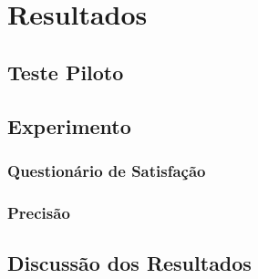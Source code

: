 \chapter{Resultados}\label{chapter:resultados}

\lipsum[1]

\section{Teste Piloto}

\lipsum[1]

\section{Experimento}

\lipsum[1]

\subsection{Questionário de Satisfação}

\lipsum[1]

\subsection{Precisão}

\lipsum[1]

\section{Discussão dos Resultados}

\lipsum[1]